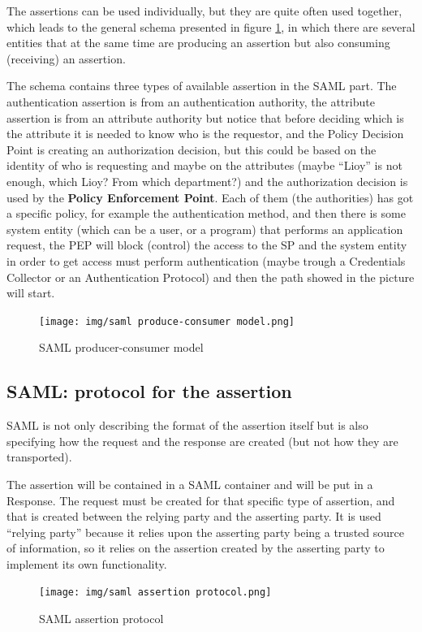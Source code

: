 The assertions can be used individually, but they are quite often used
together, which leads to the general schema presented in figure
\ref{fig:saml produce-consumer model}, in which there are several
entities that at the same time are producing an assertion but also
consuming (receiving) an assertion. 

The schema contains three types of available assertion in the SAML
part. The authentication assertion is from an authentication
authority, the attribute assertion is from an attribute authority but
notice that before deciding which is the attribute it is needed to
know who is the requestor, and the Policy Decision Point is creating
an authorization decision, but this could be based on the identity of
who is requesting and maybe on the attributes (maybe “Lioy” is not
enough, which Lioy? From which department?) and the authorization
decision is used by the \textbf{Policy Enforcement Point}. Each of them (the
authorities) has got a specific policy, for example the
authentication method, and then there is some system entity (which can
be a user, or a program) that performs an application request, the PEP
will block (control) the access to the SP and the system entity in
order to get access must perform authentication (maybe trough a
Credentials Collector or an Authentication Protocol) and then the path
showed in the picture will start.
\begin{figure}[H]
  \centering
  \texttt{[image: img/saml produce-consumer
  model.png]}
  \caption{SAML producer-consumer model}
  \label{fig:saml produce-consumer model}
\end{figure}

\subsection{SAML: protocol for the assertion}
SAML is not only describing the format of the assertion itself but is
also specifying how the request and the response are created (but not
how they are transported).

The assertion will be contained in a SAML container and will be put in
a Response. The request must be created for that specific type of
assertion, and that is created between the relying party and the
asserting party. It is used “relying party” because it relies upon the
asserting party being a trusted source of information, so it relies on
the assertion created by the asserting party to implement its own
functionality.

\begin{figure}[H]
  \centering
  \texttt{[image: img/saml assertion
  protocol.png]}
  \caption{SAML assertion protocol}
\end{figure}

